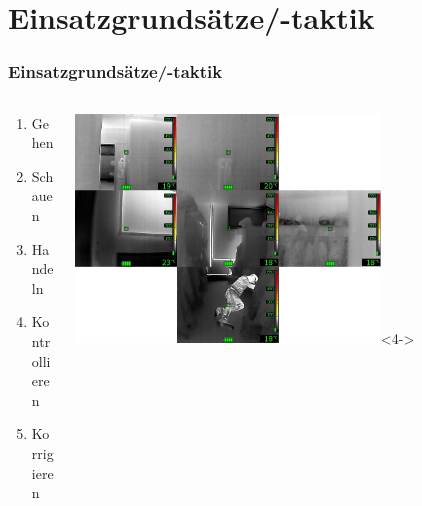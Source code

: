 \documentclass[aspectratio=169]{beamer}
\begin{document}
                                        \section{Einsatzgrundsätze/-taktik}
                                        \begin{frame}
                                        \frametitle{Einsatzgrundsätze/-taktik}
                                        \begin{columns}
                                        \begin{column}{0.3\textwidth}
                                        \begin{enumerate}
                                        \item<2-> Gehen
                                        \item<3-> Schauen
                                        \item<5-> Handeln
                                        \item<6-> Kontrollieren
                                        \item<7-> Korrigieren
                                        \end{enumerate}
                                        \end{column}
                                        \begin{column}{0.7\textwidth}
                                        \begin{center}
                                        \includegraphics[width=0.7\textwidth, keepaspectratio]{wuerfelblick}<4->
                                        \end{center}
                                        \end{column}
                                        \end{columns}
                                        \end{frame}
\end{document}
